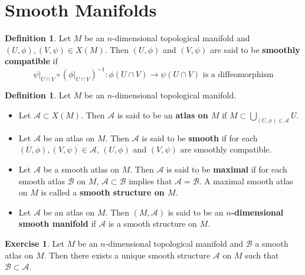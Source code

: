 \documentclass{book}
\theoremstyle{definition}
\newtheorem{defn}[definition]{Definition}
\newtheorem{ex}[definition]{Exercise}
\newcommand{\MA}{\mathcal{A}}
\newcommand{\MB}{\mathcal{B}}
\DeclareMathOperator*{\0}{\mbf{0}}
\DeclareMathOperator*{\1}{\mbf{1}}
\newcommand{\tbf}[1]{\textbf{#1}}
\begin{document}
	
	
	
	
	
	
	
	
	
	
	
	
	\newpage
	\section{Smooth Manifolds}

	\begin{defn}
		Let $M$ be an $n$-dimensional topological manifold and $(U, \phi), (V, \psi) \in X(M)$. Then $(U, \phi)$ and $(V, \psi)$ are said to be \tbf{smoothly compatible} if $$\psi|_{U \cap V} \circ (\phi|_{U \cap V})^{-1}: \phi(U \cap V) \rightarrow \psi (U \cap V) \text{ is a diffeomorphism}$$ 
	\end{defn}

	\begin{defn} Let $M$ be an $n$-dimensional topological manifold.
		\begin{itemize}
			\item Let $\MA \subset X(M)$. Then $\MA$ is said to be an \tbf{atlas on $M$} if  $M \subset \bigcup\limits_{(U,\phi) \in \MA} U$.
			\item Let $\MA$ be an atlas on $M$. Then $\MA$ is said to be \tbf{smooth} if for each $(U, \phi), (V, \psi) \in \MA$, $(U,\phi)$ and $(V,\psi)$ are smoothly compatible.
			\item Let $\MA$ be a smooth atlas on $M$. Then $\MA$ is said to be \tbf{maximal} if for each smooth atlas $\MB$ on $M$, $\MA \subset \MB$ implies that $\MA = \MB$. A maximal smooth atlas on $M$ is called a \tbf{smooth structure on $M$}.
			\item Let $\MA$ be an atlas on $M$. Then $(M, \MA)$ is said to be an \tbf{$n$-dimensional smooth manifold} if $\MA$ is a smooth structure on $M$. 
		\end{itemize}
	\end{defn}

	\begin{ex}
		Let $M$ be an $n$-dimensional topological manifold and $\MB$ a smooth atlas on $M$. Then there exists a unique smooth structure $\MA$ on $M$ such that $\MB \subset \MA$.
	\end{ex}
\end{document}
